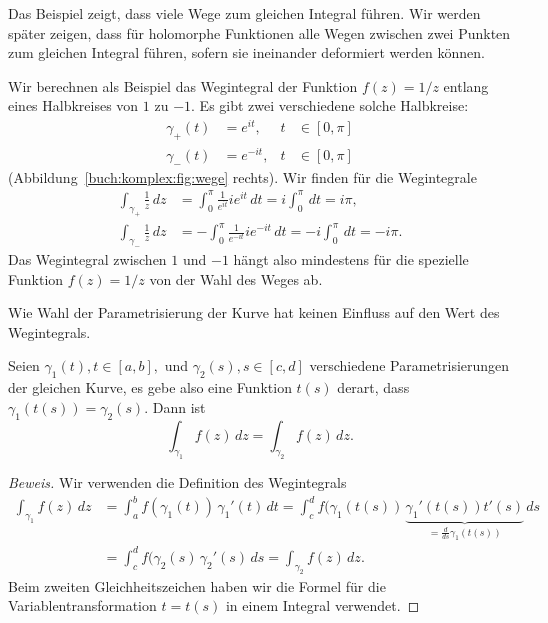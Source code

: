 Das Beispiel zeigt, dass viele Wege zum gleichen Integral führen.
Wir werden später zeigen, dass für holomorphe Funktionen alle
Wegen zwischen zwei Punkten zum gleichen Integral führen, sofern
sie ineinander deformiert werden können.

\begin{beispiel}
Wir berechnen als Beispiel das Wegintegral der Funktion $f(z)=1/z$ entlang
eines Halbkreises von $1$ zu $-1$.
Es gibt zwei verschiedene solche Halbkreise:
\begin{equation*}
\begin{aligned}
\gamma_+(t)&=e^{it},&t&\in[0,\pi]
\\
\gamma_-(t)&=e^{-it},&t&\in[0,\pi]
\end{aligned}
\end{equation*}
(Abbildung~\ref{buch:komplex:fig:wege} rechts).
Wir finden für die Wegintegrale
\begin{align*}
\int_{\gamma_+}\frac1z\,dz
&=
\int_0^\pi \frac1{e^{it}}ie^{it}\,dt=i\int_0^\pi\,dt=i\pi,
\\
\int_{\gamma_-}\frac1z\,dz
&=
-\int_0^\pi \frac1{e^{-it}}ie^{-it}\,dt=-i\int_0^\pi\,dt=-i\pi.
\end{align*}
Das Wegintegral zwischen $1$ und $-1$ hängt also mindestens für die
spezielle Funktion $f(z)=1/z$ von der Wahl des Weges ab.
\end{beispiel}

Wie Wahl der Parametrisierung der Kurve hat keinen Einfluss auf den
Wert des Wegintegrals.

\begin{satz}
%
Seien $\gamma_1(t), t\in[a,b],$ und $\gamma_2(s),s\in[c,d]$
verschiedene Parametrisierungen
%
der gleichen Kurve, es gebe also eine Funktion $t(s)$ derart, dass
$\gamma_1(t(s))=\gamma_2(s)$.
Dann ist
\[
\int_{\gamma_1}f(z)\,dz
=
\int_{\gamma_2}f(z)\,dz.
\]
\end{satz}

\begin{proof}[Beweis]
Wir verwenden die Definition des Wegintegrals
\begin{align*}
\int_{\gamma_1} f(z)\,dz
&=
\int_a^b f(\gamma_1(t))\,\gamma_1'(t)\,dt
=
\int_c^d f(\gamma_1(t(s))\,\underbrace{\gamma_1'(t(s)) t'(s)}_{\displaystyle
=\frac{d}{ds}\gamma_1(t(s))}\,ds
\\
&=
\int_c^d f(\gamma_2(s)\,\gamma_2'(s)\,ds
=
\int_{\gamma_2}f(z)\,dz.
\end{align*}
Beim zweiten Gleichheitszeichen haben wir die Formel für die
Variablentransformation $t=t(s)$ in einem Integral verwendet.
%
\end{proof}

